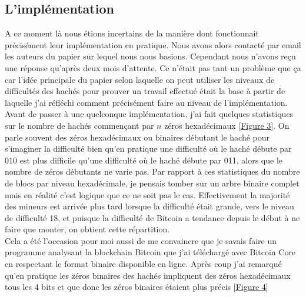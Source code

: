 \documentclass[12pt,a4paper]{article}
\newcommand{\annexe}[2]{\hyperlink{#1}{[Figure #2]}}
\begin{document}
	\subsection{L'implémentation} %
	
	A ce moment là nous étions incertains de la manière dont fonctionnait précisément leur implémentation en pratique. Nous avons alors contacté par email les auteurs du papier sur lequel nous nous basions. Cependant nous n'avons reçu une réponse qu'après deux mois d'attente. Ce n'était pas tant un problème que ça car l'idée principale du papier selon laquelle on peut utiliser les niveaux de difficultés des hachés pour prouver un travail effectué était la base à partir de laquelle j'ai réfléchi comment précisément faire au niveau de l'implémentation. Avant de passer à une quelconque implémentation, j'ai fait quelques statistiques sur le nombre de hachés commençant par $n$ zéros hexadécimaux \annexe{23}{3}. On parle souvent des zéros hexadécimaux ou binaires débutant le haché pour s'imaginer la difficulté bien qu'en pratique une difficulté où le haché débute par 010 est plus difficile qu'une difficulté où le haché débute par 011, alors que le nombre de zéros débutants ne varie pas. Par rapport à ces statistiques du nombre de blocs par niveau hexadécimale, je pensais tomber sur un arbre binaire complet mais en réalité c'est logique que ce ne soit pas le cas. Effectivement la majorité des mineurs est arrivée plus tard lorsque la difficulté était grande, vers le niveau de difficulté 18, et puisque la difficulté de Bitcoin a tendance depuis le début à ne faire que monter, on obtient cette répartition.\\ %
Cela a été l'occasion pour moi aussi de me convaincre que je savais faire un programme analysant la blockchain Bitcoin que j'ai téléchargé avec Bitcoin Core en respectant le format binaire disponible en ligne. Après coup j'ai remarqué qu'en pratique les zéros binaires des hachés impliquent des zéros hexadécimaux tous les 4 bits et que donc les zéros binaires étaient plus précis \annexe{24}{4} %
	
	
	
\end{document}
